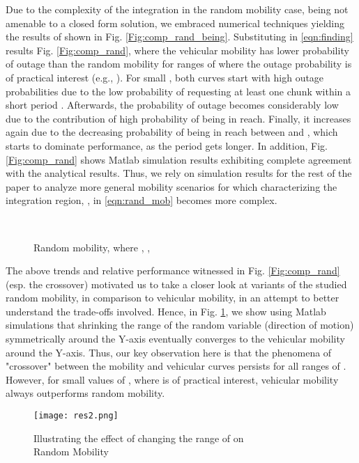\documentclass[conference,a4paper]{IEEEtran}
\begin{document}
Due to the complexity of the integration in the random mobility case, being not amenable to a closed form solution, we embraced numerical techniques yielding the results of  shown in Fig. \ref{Fig:comp_rand_being}. Substituting in \eqref{eqn:finding} results Fig. \ref{Fig:comp_rand}, where the vehicular mobility has lower probability of outage than the random mobility for ranges of  where the outage probability is of practical interest (e.g., ). For small , both curves start with high outage probabilities due to the low probability of  requesting at least one chunk within a short period . Afterwards, the probability of outage becomes considerably low due to the contribution of high probability of being in reach. Finally, it increases again due to the decreasing probability of being in reach between  and , which starts to dominate performance, as the period  gets longer. In addition, Fig. \ref{Fig:comp_rand} shows Matlab simulation results exhibiting complete agreement with the analytical results. Thus, we rely on simulation results for the rest of the paper to analyze more general mobility scenarios for which characterizing the integration region, , in \eqref{eqn:rand_mob} becomes more complex.
\begin{figure}[!t]
\centering
{}\\
\caption{Random mobility, where , , }
\setlength{\abovecaptionskip}{-10pt}
\setlength{\belowcaptionskip}{-15pt}
\end{figure}
The above trends and relative performance witnessed in Fig. \ref{Fig:comp_rand} (esp. the crossover) motivated us to take a closer look at variants of the studied random mobility, in comparison to vehicular mobility, in an attempt to better understand the trade-offs involved. Hence, in Fig. \ref{Fig:comp_rand_around_y}, we show using Matlab simulations that shrinking the range of the random variable  (direction of motion) symmetrically around the Y-axis eventually converges to the vehicular mobility around the Y-axis. Thus, our key observation here is that the phenomena of "crossover" between the mobility and vehicular curves persists for all ranges of . However, for small values of , where  is of practical interest, vehicular mobility always outperforms random mobility.
\begin{figure}[!t]
\centering
\advance{}
\texttt{[image: res2.png]}
\setlength{\abovecaptionskip}{-10pt}
\setlength{\belowcaptionskip}{-15pt}
\caption{Illustrating the effect of changing the range of  on \\ Random Mobility}
\label{Fig:comp_rand_around_y}
\end{figure}
\end{document}
